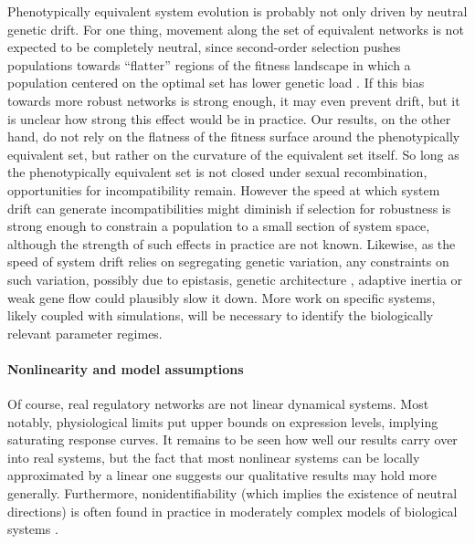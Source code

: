 \documentclass{article}
\newcommand{\1}{\mathbbm{1}}
\begin{document}
Phenotypically equivalent system evolution is probably not only driven by neutral genetic drift.
  
For one thing, movement along the set of equivalent networks
is not expected to be completely neutral,
since second-order selection pushes populations towards
``flatter'' regions of the fitness landscape
in which a population centered on the optimal set has lower genetic load
\citep[as described in different contexts by][]{rice1998evolution,neutral_network_physics}.
If this bias towards more robust networks is strong enough,
it may even prevent drift, but it is unclear how strong this effect would be in practice.
Our results, on the other hand, do not rely on the flatness of the fitness surface
around the phenotypically equivalent set, but rather on the curvature of the equivalent set itself.
So long as the phenotypically equivalent set is not closed under sexual recombination,
opportunities for incompatibility remain.
However the speed at which system drift can generate incompatibilities might diminish
if selection for robustness is strong enough to constrain a population
to a small section of system space,
although the strength of such effects in practice are not known.
Likewise, as the speed of system drift relies on segregating genetic variation,
any constraints on such variation,
possibly due to epistasis, genetic architecture \citep{hermisson2003epistasis}, adaptive inertia \citep{baatz1997adaptive,alvarez2009effects} or weak gene flow could plausibly slow it down.
More work on specific systems,
likely coupled with simulations,
will be necessary to identify the biologically relevant parameter regimes.

\paragraph{Nonlinearity and model assumptions}
Of course, real regulatory networks are not linear dynamical systems.
Most notably, physiological limits put upper bounds on expression levels,
implying saturating response curves.
It remains to be seen how well our results carry over into real systems,
but the fact that most nonlinear systems can be locally approximated by a linear one
suggests our qualitative results may hold more generally. 
Furthermore, nonidentifiability (which implies the existence of neutral directions)
is often found in practice in moderately complex models of biological systems \citep[e.g.,][]{gutenkunst2007universally,piazza2008diverse,jimenez2017spectrum}.
\end{document}
